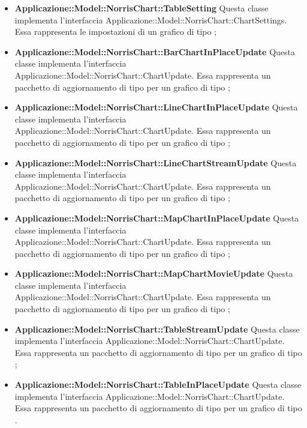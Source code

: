 \begin{itemize}
		\item \textbf{Applicazione::Model::NorrisChart::TableSetting} Questa classe implementa l'interfaccia Applicazione::Model::NorrisChart::ChartSettings. Essa rappresenta le impostazioni di un grafico di tipo ;

		\item \textbf{Applicazione::Model::NorrisChart::BarChartInPlaceUpdate} Questa classe implementa l'interfaccia Applicazione::Model::NorrisChart::ChartUpdate. Essa rappresenta un pacchetto di aggiornamento di tipo  per un grafico di tipo ;

		\item \textbf{Applicazione::Model::NorrisChart::LineChartInPlaceUpdate} Questa classe implementa l'interfaccia Applicazione::Model::NorrisChart::ChartUpdate. Essa rappresenta un pacchetto di aggiornamento di tipo  per un grafico di tipo ;

		\item \textbf{Applicazione::Model::NorrisChart::LineChartStreamUpdate} Questa classe implementa l'interfaccia Applicazione::Model::NorrisChart::ChartUpdate. Essa rappresenta un pacchetto di aggiornamento di tipo  per un grafico di tipo ;

		\item \textbf{Applicazione::Model::NorrisChart::MapChartInPlaceUpdate} Questa classe implementa l'interfaccia Applicazione::Model::NorrisChart::ChartUpdate. Essa rappresenta un pacchetto di aggiornamento di tipo  per un grafico di tipo ;

		\item \textbf{Applicazione::Model::NorrisChart::MapChartMovieUpdate} Questa classe implementa l'interfaccia Applicazione::Model::NorrisChart::ChartUpdate. Essa rappresenta un pacchetto di aggiornamento di tipo  per un grafico di tipo ;

		\item \textbf{Applicazione::Model::NorrisChart::TableStreamUpdate} Questa classe implementa l'interfaccia Applicazione::Model::NorrisChart::ChartUpdate. Essa rappresenta un pacchetto di aggiornamento di tipo  per un grafico di tipo ;

		\item \textbf{Applicazione::Model::NorrisChart::TableInPlaceUpdate} Questa classe implementa l'interfaccia Applicazione::Model::NorrisChart::ChartUpdate. Essa rappresenta un pacchetto di aggiornamento di tipo  per un grafico di tipo .
	\end{itemize}
